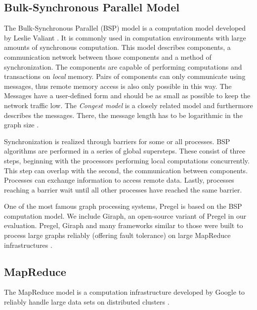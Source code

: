 \subsection{Bulk-Synchronous Parallel Model}
\label{sec:bsp}
The Bulk-Synchronous Parallel (BSP) model is a computation model developed by Leslie Valiant \cite{bsp}. It is commonly used in computation environments with large amounts of synchronous computation.
This model describes components, a communication network between those components and a method of synchronization.
The components are capable of performing computations and transactions on \emph{local} memory. Pairs of components can only communicate using messages, thus remote memory access is also only possible in this way.
The Messages have a user-defined form and should be as small as possible to keep the network traffic low. The \emph{Congest model} is a closely related model and furthermore describes the messages. There, the message length has to be logarithmic in the graph size \cite{congestModel}.

Synchronization is realized through barriers for some or all processes.
BSP algorithms are performed in a series of global supersteps. These consist of three steps, beginning with the processors performing local computations concurrently.
This step can overlap with the second, the communication between components. Processes can exchange information to access remote data.
Lastly, processes reaching a barrier wait until all other processes have reached the same barrier.

One of the most famous graph processing systems, Pregel \cite{pregel} is based on the BSP computation model. We include Giraph, an open-source variant of Pregel in our evaluation.
Pregel, Giraph and many frameworks similar to those were built to process large graphs reliably (offering fault tolerance) on large MapReduce infrastructures \cite{Giraph,graphx,powergraph}.

\subsection{MapReduce}
The MapReduce model is a computation infrastructure developed by Google to reliably handle large data sets on distributed clusters \cite{mapreduce}.

